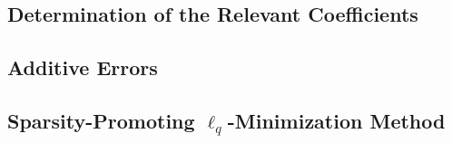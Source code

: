 \subsection{Determination of the Relevant  Coefficients}
\label{subsec:imp_fourier_coefficients}


\subsection{Additive Errors}


%

\subsection{Sparsity-Promoting $\ell_{q}$-Minimization Method}
\label{subsec:imp_lq_minimization}



